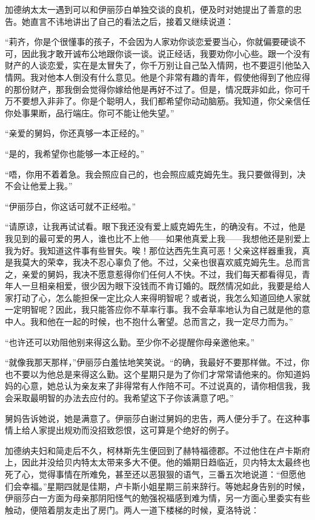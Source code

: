 \par 加德纳太太一遇到可以和伊丽莎白单独交谈的良机，便及时对她提出了善意的忠告。她直言不讳地讲出了自己的看法之后，接着又继续说道：
\par “莉齐，你是个很懂事的孩子，不会因为人家劝你谈恋爱要当心，你就偏要硬谈不可，因此我才敢开诚布公地跟你谈一谈。说正经话，我要劝你小心些。跟一个没有财产的人谈恋爱，实在是太冒失了，你千万别让自己坠入情网，也不要逗引他坠入情网。我对他本人倒没有什么意见。他是个非常有趣的青年，假使他得到了他应得的那份财产，那我倒会觉得你嫁给他是再好不过了。但是，情况既非如此，你可千万不要想入非非了。你是个聪明人，我们都希望你动动脑筋。我知道，你父亲信任你处事果断，品行端庄。你可不能让他失望。”
\par “亲爱的舅妈，你还真够一本正经的。”
\par “是的，我希望你也能够一本正经的。”
\par “唔，你用不着着急。我会照应自己的，也会照应威克姆先生。我只要做得到，决不会让他爱上我。”
\par “伊丽莎白，你这话可就不正经啦。”
\par “请原谅，让我再试试看。眼下我还没有爱上威克姆先生，的确没有。不过，他是我见到的最可爱的男人，谁也比不上他——如果他真爱上我——我想他还是别爱上我为好。我知道这件事有些冒失。唉！那位达西先生真可恶！父亲这样器重我，真是我莫大的荣幸，我决不忍心辜负了他。不过，父亲也很喜欢威克姆先生。总而言之，亲爱的舅妈，我决不愿意惹得你们任何人不快。不过，我们每天都看得见，青年人一旦相亲相爱，很少因为眼下没钱而不肯订婚的。既然情况如此，我要是给人家打动了心，怎么能担保一定比众人来得明智呢？或者说，我怎么知道回绝人家就一定明智呢？因此，我只能答应你不草率行事。我不会草率地认为自己就是他的意中人。我和他在一起的时候，也不抱什么奢望。总而言之，我一定尽力而为。”
\par “也许还可以劝阻他别来得这么勤。至少你不必提醒你母亲邀他来。”
\par “就像我那天那样，”伊丽莎白羞怯地笑笑说。“的确，我最好不要那样做。不过，你也不要以为他总是来得这么勤。这个星期只是为了你们才常常请他来的。你知道妈妈的心意，她总认为亲友来了非得常有人作陪不可。不过说真的，请你相信我，我会采取最明智的办法去应付的。我希望这下子你该满意了吧。”
\par 舅妈告诉她说，她是满意了。伊丽莎白谢过舅妈的忠告，两人便分手了。在这种事情上给人家提出规劝而没招致怨恨，这可算是个绝好的例子。
\par 加德纳夫妇和简走后不久，柯林斯先生便回到了赫特福德郡。不过他住在卢卡斯府上，因此并没给贝内特太太带来多大不便。他的婚期日趋临近，贝内特太太最终也死了心，觉得事情在所难免，甚至还以恶狠狠的语气，三番五次地说道：“但愿他们会幸福。”星期四就是佳期，卢卡斯小姐星期三前来辞行。等她起身告别的时候，伊丽莎白一方面为母亲那阴阳怪气的勉强祝福感到难为情，另一方面心里委实有些触动，便陪着朋友走出了房门。两人一道下楼梯的时候，夏洛特说：
